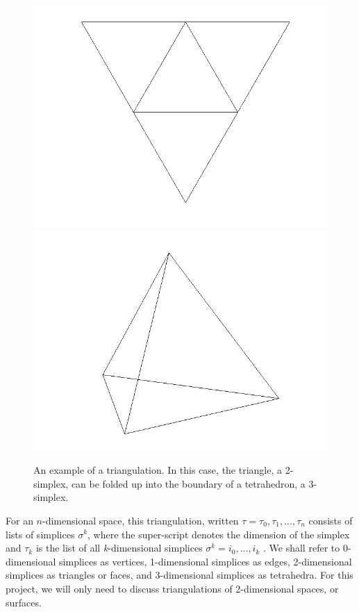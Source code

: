 \documentclass[12pt]{article}
\begin{document}
\begin{figure}
\includegraphics[scale = 0.5]{Pictures/flattetrahedron.png}
\includegraphics[scale = 0.3]{Pictures/tetrahedron.jpg}
\caption{An example of a triangulation. In this case, the triangle, a 2-simplex, can be folded up into the boundary of a tetrahedron, a 3-simplex.}
\end{figure}

\noindent For an $n$-dimensional space, this triangulation, written $\tau = {\tau_0, \tau_1, ... , \tau_n}$ consists of lists of simplices $\sigma^k$, where the super-script denotes the dimension of the simplex and $\tau_k$ is the list of all \textit{k}-dimensional simplices $\sigma^k = {i_0, ... , i_k}$ \cite{Dave}. We shall refer to 0-dimensional simplices as vertices, 1-dimensional simplices as edges, 2-dimensional simplices as triangles or faces, and 3-dimensional simplices as tetrahedra. For this project, we will only need to discuss triangulations of 2-dimensional spaces, or surfaces.\newline
\end{document}
